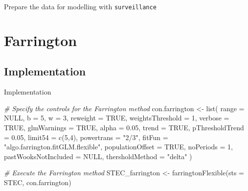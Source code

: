 \documentclass[aspectratio=169]{beamer}
\newenvironment{Shaded}{\begin{snugshade}}{\end{snugshade}}
\newcommand{\AttributeTok}[1]{\textcolor[rgb]{0.77,0.63,0.00}{#1}}
\newcommand{\CommentTok}[1]{\textcolor[rgb]{0.56,0.35,0.01}{\textit{#1}}}
\newcommand{\ConstantTok}[1]{\textcolor[rgb]{0.00,0.00,0.00}{#1}}
\newcommand{\DecValTok}[1]{\textcolor[rgb]{0.00,0.00,0.81}{#1}}
\newcommand{\FloatTok}[1]{\textcolor[rgb]{0.00,0.00,0.81}{#1}}
\newcommand{\FunctionTok}[1]{\textcolor[rgb]{0.00,0.00,0.00}{#1}}
\newcommand{\NormalTok}[1]{#1}
\newcommand{\OtherTok}[1]{\textcolor[rgb]{0.56,0.35,0.01}{#1}}
\newcommand{\StringTok}[1]{\textcolor[rgb]{0.31,0.60,0.02}{#1}}
\begin{document}
\begin{frame}[fragile]{Prepare the data for modelling with
\texttt{surveillance}}
\normalsize
\end{frame}

\hypertarget{farrington}{%
\section{Farrington}\label{farrington}}

\hypertarget{implementation}{%
\subsection{Implementation}\label{implementation}}

\begin{frame}[fragile]{Implementation}
\tiny

\begin{Shaded}
\begin{Highlighting}[]
\CommentTok{\# Specify the controls for the Farrington method}
\NormalTok{con.farrington }\OtherTok{\textless{}{-}} \FunctionTok{list}\NormalTok{(}
  \AttributeTok{range =} \ConstantTok{NULL}\NormalTok{, }\AttributeTok{b =} \DecValTok{5}\NormalTok{, }\AttributeTok{w =} \DecValTok{3}\NormalTok{,}
  \AttributeTok{reweight =} \ConstantTok{TRUE}\NormalTok{, }\AttributeTok{weightsThreshold =} \DecValTok{1}\NormalTok{,}
  \AttributeTok{verbose =} \ConstantTok{TRUE}\NormalTok{, }\AttributeTok{glmWarnings =} \ConstantTok{TRUE}\NormalTok{,}
  \AttributeTok{alpha =} \FloatTok{0.05}\NormalTok{, }\AttributeTok{trend =} \ConstantTok{TRUE}\NormalTok{, }\AttributeTok{pThresholdTrend =} \FloatTok{0.05}\NormalTok{,}
  \AttributeTok{limit54 =} \FunctionTok{c}\NormalTok{(}\DecValTok{5}\NormalTok{,}\DecValTok{4}\NormalTok{), }\AttributeTok{powertrans =} \StringTok{"2/3"}\NormalTok{,}
  \AttributeTok{fitFun =} \StringTok{"algo.farrington.fitGLM.flexible"}\NormalTok{,}
  \AttributeTok{populationOffset =} \ConstantTok{TRUE}\NormalTok{,}
  \AttributeTok{noPeriods =} \DecValTok{1}\NormalTok{, }\AttributeTok{pastWooksNotIncluded =} \ConstantTok{NULL}\NormalTok{,}
  \AttributeTok{thersholdMethod =} \StringTok{"delta"}
\NormalTok{)}

\CommentTok{\# Execute the Farrington method}
\NormalTok{STEC\_farrington }\OtherTok{\textless{}{-}} \FunctionTok{farringtonFlexible}\NormalTok{(}\AttributeTok{sts =}\NormalTok{ STEC, con.farrington)}
\end{Highlighting}
\end{Shaded}

\normalsize
\end{frame}
\end{document}
